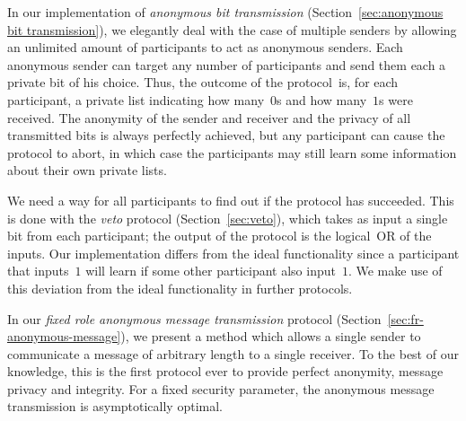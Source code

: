 \documentclass[11pt]{article}
\begin{document}
In our implementation of \emph{anonymous bit transmission}
(Section~\ref{sec:anonymous bit transmission}), we elegantly deal
with the case of multiple senders by allowing an unlimited amount of
participants to act as anonymous senders. Each anonymous sender can
target any number of participants and send them each a private bit
of his choice. Thus, the outcome of the protocol~is, for each
participant, a private list indicating how many~$0$s and how
many~$1$s were received. The anonymity of the sender and  receiver
and the privacy of all transmitted bits is always perfectly
achieved, but any participant can cause the protocol to abort, in
which case the participants may still learn some information about
their own private lists.


We need a way for all participants to find out if the protocol has
succeeded. This is done with the \emph{veto} protocol
(Section~\ref{sec:veto}), which takes as input a single bit from
each participant; the output of the protocol is the logical~OR of
the inputs. Our implementation differs from the ideal functionality
since a participant that inputs~$1$ will learn if some other
participant also input~$1$. We make use of this deviation from the
ideal functionality in further protocols.


In our \emph{fixed role anonymous message transmission} protocol
(Section~\ref{sec:fr-anonymous-message}), we present a method which
allows a single sender to communicate a message of arbitrary length
to a single receiver. To the best of our knowledge, this is the
first protocol ever to provide perfect anonymity, message privacy
and integrity. For a fixed security parameter, the anonymous message
transmission is asymptotically optimal.
\end{document}
